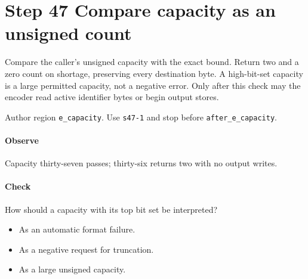 \section{Step 47 Compare capacity as an unsigned count}\label{cbor-s47}
Compare the caller's unsigned capacity with the exact bound. Return two and a zero count on shortage, preserving every destination byte. A high-bit-set capacity is a large permitted capacity, not a negative error. Only after this check may the encoder read active identifier bytes or begin output stores.

Author region \texttt{e\_capacity}. Use \texttt{s47-1} and stop before \texttt{after\_e\_capacity}.

\paragraph{Observe} Capacity thirty-seven passes; thirty-six returns two with no output writes.

\paragraph{Check} How should a capacity with its top bit set be interpreted?
\begin{itemize}
  \item[A.] As an automatic format failure.
  \item[B.] As a negative request for truncation.
  \item[C.] As a large unsigned capacity.
\end{itemize}
